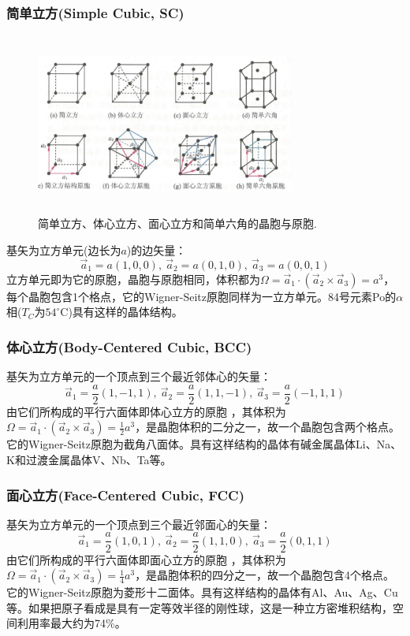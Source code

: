 \subsubsection{简单立方(Simple Cubic, SC)}
\begin{figure}[h!]
\centering
\vspace*{-0.05in}
\includegraphics[height=2.35in,width=3.35in,viewport=0 0 85 60,clip]{Figures/Bravais_Lattice.png}
\caption{\small \textrm{简单立方、体心立方、面心立方和简单六角的晶胞与原胞.}}%
\label{Fig:Bravais_Lattice-1}
\end{figure}
基矢为立方单元(边长为$a$)的边矢量：
\begin{displaymath}
\vec a_1=a(1,0,0),~\vec a_2=a(0,1,0),~\vec a_3=a(0,0,1)
\end{displaymath} 
立方单元即为它的原胞，晶胞与原胞相同，体积都为$\Omega=\vec a_1\cdot(\vec a_2\times\vec a_3)=a^3$，每个晶胞包含1个格点，它的Wigner-Seitz原胞同样为一立方单元。84号元素Po的$\alpha$相($T_C$为$54^{\circ}\mathrm{C}$)具有这样的晶体结构。

\subsubsection{体心立方(Body-Centered Cubic, BCC)}
基矢为立方单元的一个顶点到三个最近邻体心的矢量：
\begin{displaymath}
	\vec a_1=\frac a2(1,-1,1),~\vec a_2=\frac a2(1,1,-1),~\vec a_3=\frac a2(-1,1,1)
\end{displaymath} 
由它们所构成的平行六面体即体心立方的原胞 ，其体积为$\Omega=\vec a_1\cdot(\vec a_2\times\vec a_3)=\frac12a^3$，是晶胞体积的二分之一，故一个晶胞包含两个格点。它的Wigner-Seitz原胞为截角八面体。具有这样结构的晶体有碱金属晶体Li、Na、K和过渡金属晶体V、Nb、Ta等。

\subsubsection{面心立方(Face-Centered Cubic, FCC)}
基矢为立方单元的一个顶点到三个最近邻面心的矢量：
\begin{displaymath}
	\vec a_1=\frac a2(1,0,1),~\vec a_2=\frac a2(1,1,0),~\vec a_3=\frac a2(0,1,1)
\end{displaymath} 
由它们所构成的平行六面体即面心立方的原胞 ，其体积为$\Omega=\vec a_1\cdot(\vec a_2\times\vec a_3)=\frac14a^3$，是晶胞体积的四分之一，故一个晶胞包含4个格点。它的Wigner-Seitz原胞为菱形十二面体。具有这样结构的晶体有Al、Au、Ag、Cu 等。如果把原子看成是具有一定等效半径的刚性球，这是一种立方密堆积结构，空间利用率最大约为74\%。

